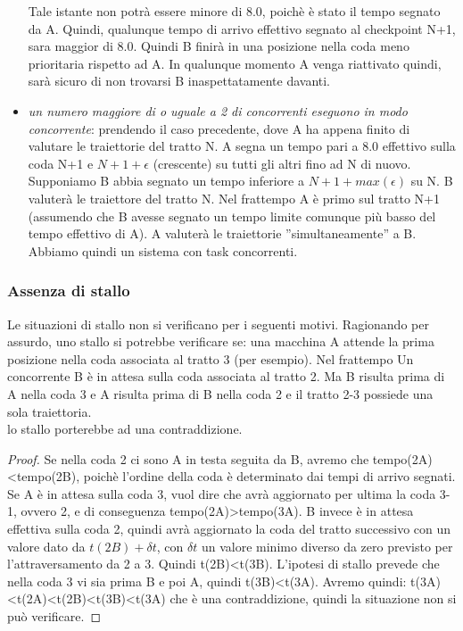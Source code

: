 \begin{itemize}
Tale istante non potr\`{a} essere minore di 8.0, poich\`{e} \`{e} stato il tempo segnato da A. Quindi, qualunque tempo di arrivo effettivo segnato al checkpoint
N+1, sara maggior di 8.0. Quindi B finir\`{a} in una posizione nella coda meno prioritaria rispetto ad A. In qualunque momento A venga riattivato quindi, sar\`{a}
sicuro di non trovarsi B inaspettatamente davanti.
\item \emph{un numero maggiore di o uguale a 2 di concorrenti eseguono in modo concorrente}: prendendo il caso precedente, dove A ha appena finito di valutare le
traiettorie del tratto N. A segna un tempo pari a 8.0 effettivo sulla coda N+1 e $N+1+\epsilon$ (crescente) su tutti gli altri fino ad N di nuovo. Supponiamo
B abbia segnato un tempo inferiore a $N+1+max(\epsilon)$ su N. B valuter\`{a} le traiettore del tratto N. Nel frattempo A \`{e} primo sul tratto N+1 (assumendo
che B avesse segnato un tempo limite comunque pi\`{u} basso del tempo effettivo di A). A valuter\`{a} le traiettorie
''simultaneamente'' a B. Abbiamo quindi un sistema con task concorrenti.
\end{itemize}
\subsubsection{Assenza di stallo}
Le situazioni di stallo non si verificano per i seguenti motivi. Ragionando per assurdo, uno stallo si potrebbe verificare se:
una macchina A attende la prima posizione nella coda associata al tratto 3 (per esempio). 
Nel frattempo Un concorrente B \`{e} in attesa sulla coda associata al tratto 2. Ma B risulta prima di A nella coda 3 e A 
risulta prima di B nella coda 2 e il tratto 2-3 possiede una sola traiettoria.\\
lo stallo porterebbe ad una contraddizione.\\
\begin{proof}
	Se nella coda 2 ci sono A in testa seguita da B, avremo che tempo(2A)<tempo(2B), poich\`{e} l'ordine della coda \`{e} 
	determinato dai tempi di arrivo segnati.
	Se A \`{e} in attesa sulla coda 3, vuol dire che avr\`{a} aggiornato per ultima la coda 3-1, ovvero 2, e di conseguenza tempo(2A)>tempo(3A).
	B invece \`{e} in attesa effettiva sulla coda 2, quindi avr\`{a} aggiornato la coda del tratto successivo con un valore dato da $t(2B)+ \delta t$, 
	con $ \delta t$ un valore minimo diverso da zero previsto per l'attraversamento da 2 a 3. Quindi t(2B)<t(3B).
	L'ipotesi di stallo prevede che nella coda 3 vi sia prima B e poi A, quindi t(3B)<t(3A).
	Avremo quindi:
		t(3A)<t(2A)<t(2B)<t(3B)<t(3A)
	che \`{e} una contraddizione, quindi la situazione non si pu\`{o} verificare.
\end{proof}
\newpage
